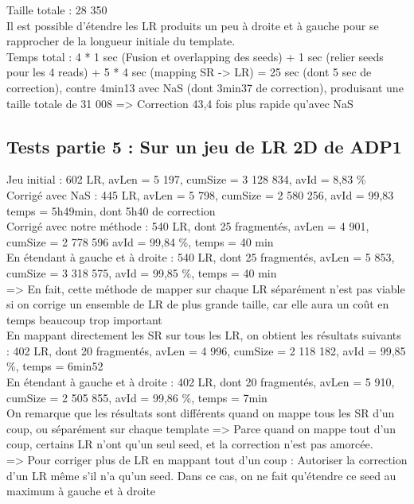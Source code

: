 \documentclass[12pt]{article}
\begin{document}
Taille totale : 28 350 \\

Il est possible d'étendre les LR produits un peu à droite et à gauche pour se rapprocher de la longueur initiale du template. \\

Temps total : 4 * 1 sec (Fusion et overlapping des seeds) + 1 sec (relier seeds pour les 4 reads) + 5 * 4 sec (mapping SR -> LR) = 25 sec (dont 5 sec de correction), contre 4min13 avec NaS (dont 3min37 de correction), produisant une taille totale de 31 008 => Correction 43,4 fois plus rapide qu'avec NaS

\subsection{Tests partie 5 : Sur un jeu de LR 2D de ADP1}

Jeu initial : 602 LR, avLen = 5 197, cumSize = 3 128 834, avId = 8,83 \% \\

Corrigé avec NaS : 445 LR, avLen = 5 798, cumSize = 2 580 256, avId = 99,83 temps = 5h49min, dont 5h40 de correction \\

Corrigé avec notre méthode : 540 LR, dont 25 fragmentés, avLen = 4 901, cumSize = 2 778 596 avId = 99,84 \%, temps = 40 min \\

En étendant à gauche et à droite : 540 LR, dont 25 fragmentés, avLen = 5 853, cumSize = 3 318 575, avId = 99,85 \%, temps = 40 min \\

=> En fait, cette méthode de mapper sur chaque LR séparément n'est pas viable si on corrige un ensemble de LR de plus grande taille,
car elle aura un coût en temps beaucoup trop important \\

En mappant directement les SR sur tous les LR, on obtient les résultats suivants : 402 LR, dont 20 fragmentés, avLen = 4 996, cumSize = 2 118 182, avId = 99,85 \%, temps = 6min52 \\

En étendant à gauche et à droite : 402 LR, dont 20 fragmentés, avLen = 5 910, cumSize =  2 505 855, avId = 99,86 \%, temps = 7min \\

On remarque que les résultats sont différents quand on mappe tous les SR d'un coup, ou séparément sur chaque template => Parce quand on mappe tout d'un coup, certains LR n'ont qu'un seul seed, et la correction n'est pas amorcée. \\
=> Pour corriger plus de LR en mappant tout d'un coup : Autoriser la correction d'un LR même s'il n'a qu'un seed. Dans ce cas, on ne fait qu'étendre ce seed au maximum à gauche et à droite \\
\end{document}
